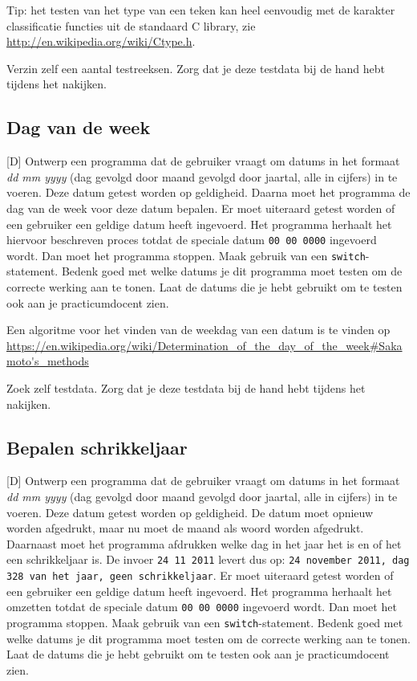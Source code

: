 \documentclass[a4paper,10pt,fleqn,twoside]{article}
\begin{document}
Tip: het testen van het type van een teken kan heel eenvoudig met de karakter classificatie functies uit de standaard C library, zie \url{http://en.wikipedia.org/wiki/Ctype.h}.

Verzin zelf een aantal testreeksen. Zorg dat je deze testdata bij de hand hebt tijdens het nakijken.

\subsection{Dag van de week}[D]
Ontwerp een programma dat de gebruiker vraagt om datums in het formaat \textsl{dd mm yyyy} (dag gevolgd door maand gevolgd door jaartal, alle in cijfers) in te voeren. Deze datum getest worden op geldigheid. Daarna moet het programma de dag van de week voor deze datum bepalen. Er moet uiteraard getest worden of een gebruiker een geldige datum heeft ingevoerd. Het programma herhaalt het hiervoor beschreven proces totdat de speciale datum \texttt{00 00 0000} ingevoerd wordt. Dan moet het programma stoppen. Maak gebruik van een \lstinline|switch|-statement. Bedenk goed met welke datums je dit programma moet testen om de correcte werking aan te tonen. Laat de datums die je hebt gebruikt om te testen ook aan je practicumdocent zien.

Een algoritme voor het vinden van de weekdag van een datum is te vinden op \url{https://en.wikipedia.org/wiki/Determination_of_the_day_of_the_week#Sakamoto's_methods}

Zoek zelf testdata. Zorg dat je deze testdata bij de hand hebt tijdens het nakijken.

\subsection{Bepalen schrikkeljaar}[D]
\label{sec:bepalen-schrikkeljaar}
Ontwerp een programma dat de gebruiker vraagt om datums in het formaat \textsl{dd mm yyyy} (dag gevolgd door maand gevolgd door jaartal, alle in cijfers) in te voeren. Deze datum getest worden op geldigheid. De datum moet opnieuw worden afgedrukt, maar nu moet de maand als woord worden afgedrukt. Daarnaast moet het programma afdrukken welke dag in het jaar het is en of het een schrikkeljaar is. De invoer \texttt{24 11 2011} levert dus op: \texttt{24 november 2011, dag 328 van het jaar, geen schrikkeljaar}. Er moet uiteraard getest worden of een gebruiker een geldige datum heeft ingevoerd. Het programma herhaalt het omzetten totdat de speciale datum \texttt{00 00 0000} ingevoerd wordt. Dan moet het programma stoppen. Maak gebruik van een \lstinline|switch|-statement. Bedenk goed met welke datums je dit programma moet testen om de correcte werking aan te tonen. Laat de datums die je hebt gebruikt om te testen ook aan je practicumdocent zien.
\end{document}
